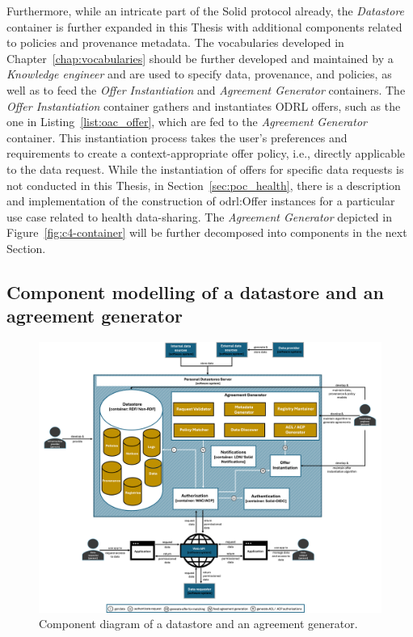 Furthermore, while an intricate part of the Solid protocol already, the \textit{Datastore} container is further expanded in this Thesis with additional components related to policies and provenance metadata.
The vocabularies developed in Chapter~\ref{chap:vocabularies} should be further developed and maintained by a \textit{Knowledge engineer} and are used to specify data, provenance, and policies, as well as to feed the \textit{Offer Instantiation} and \textit{Agreement Generator} containers.
The \textit{Offer Instantiation} container gathers and instantiates ODRL offers, such as the one in Listing~\ref{list:oac_offer}, which are fed to the \textit{Agreement Generator} container.
This instantiation process takes the user's preferences and requirements to create a context-appropriate offer policy, i.e., directly applicable to the data request.
While the instantiation of offers for specific data requests is not conducted in this Thesis, in Section~\ref{sec:poc_health}, there is a description and implementation of the construction of odrl:Offer instances for a particular use case related to health data-sharing.
The \textit{Agreement Generator} depicted in Figure~\ref{fig:c4-container} will be further decomposed into components in the next Section.

\subsection{Component modelling of a datastore and an agreement generator}
\label{sec:c4_component}

\begin{figure}[ht]
    \centering
    \includegraphics[width=1.1\linewidth]{figures//chapter-6/component.png}
    \caption{Component diagram of a datastore and an agreement generator.}
    \label{fig:c4-component}
\end{figure}

